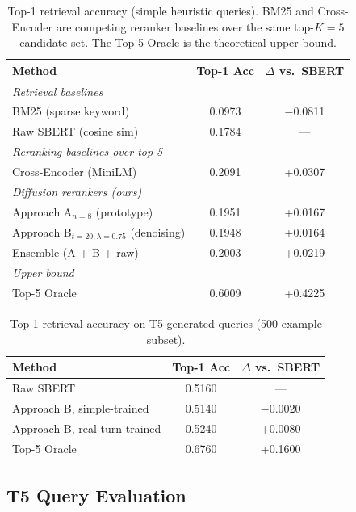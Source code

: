 \documentclass{article}
\begin{document}
\begin{table}[htbp]
\centering
\caption{Top-1 retrieval accuracy (simple heuristic queries). BM25 and Cross-Encoder are competing reranker baselines over the same top-$K=5$ candidate set. The Top-5 Oracle is the theoretical upper bound.}
\label{tab:main-results}
\begin{tabular}{lcc}
\toprule
Method & Top-1 Acc & $\Delta$ vs.\ SBERT \\
\midrule
\textit{Retrieval baselines} & & \\
BM25 (sparse keyword) & 0.0973 & $-$0.0811 \\
Raw SBERT (cosine sim) & 0.1784 & --- \\
\midrule
\textit{Reranking baselines over top-5} & & \\
Cross-Encoder (MiniLM) & 0.2091 & +0.0307 \\
\midrule
\textit{Diffusion rerankers (ours)} & & \\
Approach A$_{n=8}$ (prototype) & 0.1951 & +0.0167 \\
Approach B$_{t=20,\lambda=0.75}$ (denoising) & 0.1948 & +0.0164 \\
Ensemble (A + B + raw) & 0.2003 & +0.0219 \\
\midrule
\textit{Upper bound} & & \\
Top-5 Oracle & 0.6009 & +0.4225 \\
\bottomrule
\end{tabular}
\end{table}

\begin{table}[htbp]
\centering
\caption{Top-1 retrieval accuracy on T5-generated queries (500-example subset).}
\label{tab:t5-results}
\begin{tabular}{lcc}
\toprule
Method & Top-1 Acc & $\Delta$ vs.\ SBERT \\
\midrule
Raw SBERT & 0.5160 & --- \\
Approach B, simple-trained & 0.5140 & $-$0.0020 \\
Approach B, real-turn-trained & 0.5240 & +0.0080 \\
Top-5 Oracle & 0.6760 & +0.1600 \\
\bottomrule
\end{tabular}
\end{table}

\subsection{T5 Query Evaluation}
\end{document}
